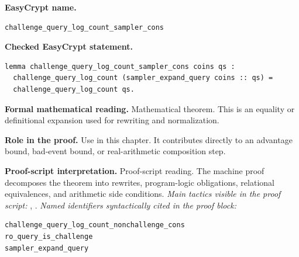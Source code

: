 \begin{formaltheorem}
\noindent\textbf{EasyCrypt name.}
\begin{lstlisting}[language=EasyCrypt,basicstyle=\ttfamily\scriptsize]
challenge_query_log_count_sampler_cons
\end{lstlisting}
\noindent\textbf{Checked EasyCrypt statement.}
\begin{lstlisting}[language=EasyCrypt,basicstyle=\ttfamily\scriptsize]
lemma challenge_query_log_count_sampler_cons coins qs :
  challenge_query_log_count (sampler_expand_query coins :: qs) =
  challenge_query_log_count qs.
\end{lstlisting}
\noindent\textbf{Formal mathematical reading.}
Mathematical theorem. This is an equality or definitional expansion used for rewriting and normalization.

\noindent\textbf{Role in the proof.}
Use in this chapter. It contributes directly to an advantage bound, bad-event bound, or real-arithmetic composition step.

\noindent\textbf{Proof-script interpretation.}
Proof-script reading. The machine proof decomposes the theorem into rewrites, program-logic obligations, relational equivalences, and arithmetic side conditions.
\emph{Main tactics visible in the proof script:} , .
\emph{Named identifiers syntactically cited in the proof block:}
\begin{lstlisting}[language=EasyCrypt,basicstyle=\ttfamily\scriptsize]
challenge_query_log_count_nonchallenge_cons
ro_query_is_challenge
sampler_expand_query
\end{lstlisting}

\end{formaltheorem}

